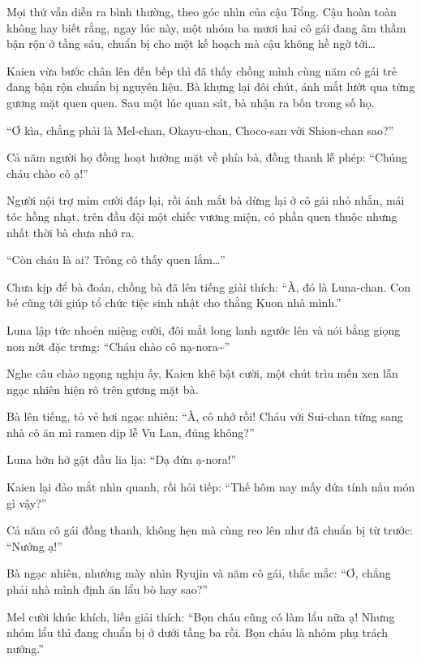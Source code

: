 \documentclass[../main.tex]{subfiles}
\begin{document}
Mọi thứ vẫn diễn ra bình thường, theo góc nhìn của cậu Tổng. Cậu hoàn toàn không hay biết rằng, ngay lúc này, một nhóm ba mươi hai cô gái đang âm thầm bận rộn ở tầng sáu, chuẩn bị cho một kế hoạch mà cậu không hề ngờ tới\dots

\ct

Kaien vừa bước chân lên đến bếp thì đã thấy chồng mình cùng năm cô gái trẻ đang bận rộn chuẩn bị nguyên liệu. Bà khựng lại đôi chút, ánh mắt lướt qua từng gương mặt quen quen. Sau một lúc quan sát, bà nhận ra bốn trong số họ.

``Ơ kìa, chẳng phải là Mel-chan, Okayu-chan, Choco-san với Shion-chan sao?''

Cả năm người họ đồng hoạt hướng mặt về phía bà, đồng thanh lễ phép: ``Chúng cháu chào cô ạ!''

Người nội trợ mỉm cười đáp lại, rồi ánh mắt bà dừng lại ở cô gái nhỏ nhắn, mái tóc hồng nhạt, trên đầu đội một chiếc vương miện, có phần quen thuộc nhưng nhất thời bà chưa nhớ ra.

``Còn cháu là ai? Trông cô thấy quen lắm\dots''

Chưa kịp để bà đoán, chồng bà đã lên tiếng giải thích: ``À, đó là Luna-chan. Con bé cũng tới giúp tổ chức tiệc sinh nhật cho thằng Kuon nhà mình.''


Luna lập tức nhoẻn miệng cười, đôi mắt long lanh ngước lên và nói bằng giọng non nớt đặc trưng: ``Cháu chào cô nạ-nora\~{}''

Nghe câu chào ngọng nghịu ấy, Kaien khẽ bật cười, một chút trìu mến xen lẫn ngạc nhiên hiện rõ trên gương mặt bà.

Bà lên tiếng, tỏ vẻ hơi ngạc nhiên: ``À, cô nhớ rồi! Cháu với Sui-chan từng sang nhà cô ăn mì ramen dịp lễ Vu Lan, đúng không?''

Luna hớn hở gật đầu lia lịa: ``Dạ đứn ạ-nora!''

Kaien lại đảo mắt nhìn quanh, rồi hỏi tiếp: ``Thế hôm nay mấy đứa tính nấu món gì vậy?''

Cả năm cô gái đồng thanh, không hẹn mà cùng reo lên như đã chuẩn bị từ trước: ``Nướng ạ!''

Bà ngạc nhiên, nhướng mày nhìn Ryujin và năm cô gái, thắc mắc: ``Ơ, chẳng phải nhà mình định ăn lẩu bò hay sao?''

Mel cười khúc khích, liền giải thích: ``Bọn cháu cũng có làm lẩu nữa ạ! Nhưng nhóm lẩu thì đang chuẩn bị ở dưới tầng ba rồi. Bọn cháu là nhóm phụ trách nướng.''
\end{document}
